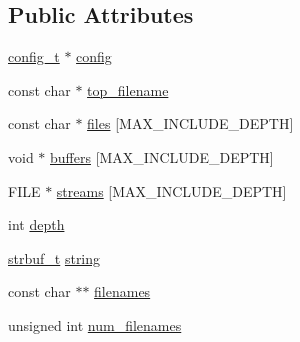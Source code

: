 \subsection*{Public Attributes}
\begin{DoxyCompactItemize}
\item 
\hyperlink{structconfig__t}{config\_\-t} $\ast$ \hyperlink{structscan__context_a535f3ae7e1140baf91f736e833192147}{config}
\item 
const char $\ast$ \hyperlink{structscan__context_ae3db7eaa46cd30631e3f154bdc514feb}{top\_\-filename}
\item 
const char $\ast$ \hyperlink{structscan__context_a2b37e18ccf435f4a0d302dd3e01c9b12}{files} \mbox{[}MAX\_\-INCLUDE\_\-DEPTH\mbox{]}
\item 
void $\ast$ \hyperlink{structscan__context_a49a22b83cacfde03f8f3ac70784ef202}{buffers} \mbox{[}MAX\_\-INCLUDE\_\-DEPTH\mbox{]}
\item 
FILE $\ast$ \hyperlink{structscan__context_a42b7e86466be147d557499f45d47cfb9}{streams} \mbox{[}MAX\_\-INCLUDE\_\-DEPTH\mbox{]}
\item 
int \hyperlink{structscan__context_aad7af2747860597a923bdd8cca07bd83}{depth}
\item 
\hyperlink{structstrbuf__t}{strbuf\_\-t} \hyperlink{structscan__context_aa23d5c633b40966b509c91068b72fc47}{string}
\item 
const char $\ast$$\ast$ \hyperlink{structscan__context_a772a7e1bd1d4c20a03393667835557c8}{filenames}
\item 
unsigned int \hyperlink{structscan__context_a62c81b43eb67d92788088d4835aa4d04}{num\_\-filenames}
\end{DoxyCompactItemize}


